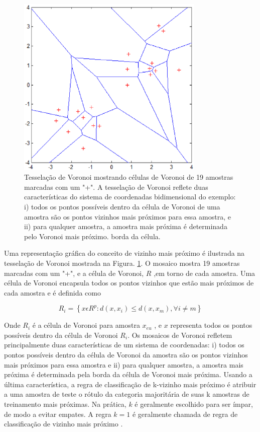 \begin{figure}[!htb]
    \centering
    \includegraphics[width=0.8\textwidth]{figuras/Knn_voronoi.eps}
    \caption{Tesselação de Voronoi mostrando células de Voronoi de 19 amostras marcadas com um "+". A tesselação de Voronoi reflete duas características do sistema de coordenadas bidimensional do exemplo: i) todos os pontos possíveis dentro da célula de Voronoi de uma amostra são os pontos vizinhos mais próximos para essa amostra, e ii) para qualquer amostra, a amostra mais próxima é determinada pelo Voronoi mais próximo. borda da célula.}
    \label{voronoiEx}
\end{figure}

Uma representação gráfica do conceito de vizinho mais próximo é ilustrada na tesselação de Voronoi \cite{voronoi1907g} mostrada na Figura. \ref{voronoiEx}. O mosaico mostra 19 amostras marcadas com um "+", e a célula de Voronoi, $ R $ ,em torno de cada amostra. Uma célula de Voronoi encapsula todos os pontos vizinhos que estão mais próximos de cada amostra e é definida como

\begin{equation} \label{eq:celVoroniEncap}
    R_{i}= \left \{ x \epsilon R^{p}: d(x,x_{i})\leq d(x,x_{m}),\forall i\neq m\right \}
\end{equation}

Onde $ R_{i} $ é a célula de Voronoi para amostra $ x_{eu} $ , e $ x $ representa todos os pontos possíveis dentro da célula de Voronoi $ R_{i} $. Os mosaicos de Voronoi refletem principalmente duas características de um sistema de coordenadas: i) todos os pontos possíveis dentro da célula de Voronoi da amostra são os pontos vizinhos mais próximos para essa amostra e ii) para qualquer amostra, a amostra mais próxima é determinada pela borda da célula de Voronoi mais próxima. Usando a última característica, a regra de classificação de k-vizinho mais próximo é atribuir a uma amostra de teste o rótulo da categoria majoritária de suas k amostras de treinamento mais próximas. Na prática, $ k $ é geralmente escolhido para ser ímpar, de modo a evitar empates. A regra $ k = 1 $ é geralmente chamada de regra de classificação de vizinho mais próximo \cite{peterson2009k}.